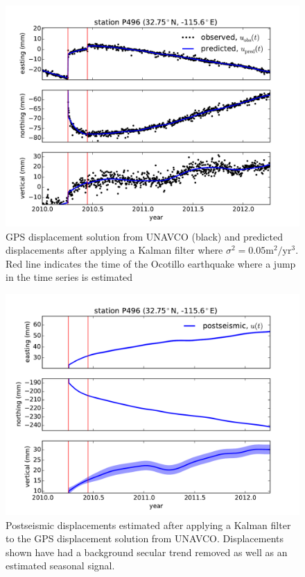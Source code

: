 \documentclass[12pt]{article}
\begin{document}
\begin{figure}
\includegraphics[scale=0.6]{Figures/figure_1}
\centering
\caption{GPS displacement solution from UNAVCO (black) and predicted displacements after applying a Kalman filter where $\sigma^2=0.05 \mathrm{m}^2/\mathrm{yr}^3$. Red line indicates the time of the Ocotillo earthquake where a jump in the time series is estimated}
\label{fig:P496Fit}
\end{figure}

\begin{figure}
\includegraphics[scale=0.6]{Figures/figure_2}
\centering
\caption{Postseismic displacements estimated after applying a Kalman filter to the GPS displacement solution from UNAVCO.  Displacements shown have had a background secular trend removed as well as an estimated seasonal signal.} 
\label{fig:P496PS}
\end{figure}
\end{document}

